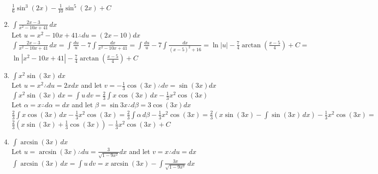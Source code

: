 \documentclass[10pt, letterpaper]{report}
\begin{document}
\begin{enumerate}
    $\frac{1}{6}\sin^{3}{(2x)}-\frac{1}{10}\sin^{5}{(2x)}+C$ \\
    
  \item{$\int{\frac{2x-3}{x^{2}-10x+41}}\,dx$} \\
  
    Let $u=x^{2}-10x+41\therefore du=(2x-10)dx$ \\
    
    $\int{\frac{2x-3}{x^{2}-10x+41}}\,dx=
    \int{\frac{du}{u}}-7\int{\frac{dx}{x^{2}-10x+41}}=
    \int{\frac{du}{u}}-7\int{\frac{dx}{(x-5)^{2}+16}}=
    \ln{|u|}-\frac{7}{4}\arctan{\left(\frac{x-5}{4}\right)}+C=$ \\
    
    $\ln{|x^{2}-10x+41|}-\frac{7}{4}\arctan{\left(\frac{x-5}{4}\right)}+C$ \\
    \pagebreak
  \item{$\int{x^{2}\sin{(3x)}}\,dx$} \\
  
    Let $u=x^{2}\therefore du=2xdx$ and let $v=-\frac{1}{3}\cos{(3x)}\therefore dv=\sin{(3x)}dx$ \\
    
    $\int{x^{2}\sin{(3x)}}\,dx=
    \int{u}\,dv=
    \frac{2}{3}\int{x\cos{(3x)}}\,dx-\frac{1}{3}x^{2}\cos{(3x)}$ \\
    
    Let $\alpha=x\therefore d\alpha=dx$ and let $\beta=\sin{3x}\therefore d\beta=3\cos{(3x)}dx$ \\
    
    $\frac{2}{3}\int{x\cos{(3x)}}\,dx-\frac{1}{3}x^{2}\cos{(3x)}=
    \frac{2}{3}\int{\alpha}\,d\beta-\frac{1}{3}x^{2}\cos{(3x)}=
    \frac{2}{3}\left(x\sin{(3x)}-\int{\sin{(3x)}}\,dx\right)-\frac{1}{3}x^{2}\cos{(3x)}=$ \\
    
    $\frac{2}{3}\left(x\sin{(3x)}+\frac{1}{3}\cos{(3x)}\right)-\frac{1}{3}x^{2}\cos{(3x)}+C$ \\
  
  \item{$\int{\arcsin{(3x)}}\,dx$} \\
  
    Let $u=\arcsin{(3x)}\therefore du=\frac{3}{\sqrt{1-9x^{2}}}dx$ and let $v=x\therefore du=dx$ \\
    
    $\int{\arcsin{(3x)}}\,dx=
    \int{u}\,dv=
    x\arcsin{(3x)}-\int{\frac{3x}{\sqrt{1-9x^{2}}}\,dx}$ \\
    

\end{enumerate}
\end{document}

